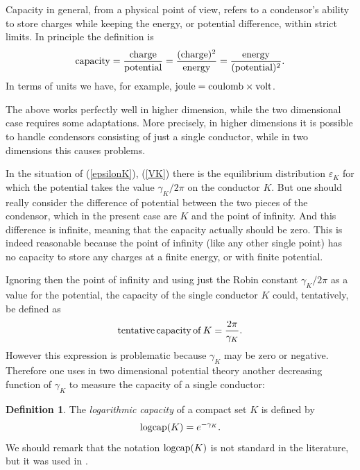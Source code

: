 \documentclass[reqno,12pt]{article}
\theoremstyle{plain}
\theoremstyle{definition}
\newtheorem{definition}{Definition}[section]
\numberwithin{equation}{section}
\numberwithin{figure}{section}
\begin{document}
Capacity in general, from a physical point of view, refers to a condensor's ability to store
charges while keeping the energy, or potential difference, within strict limits. In principle the definition is
\begin{equation}\label{capacity}
{\rm capacity}=\frac{\rm charge}{\rm potential}=\frac{({\rm charge})^2}{\rm energy}=\frac{\rm energy}{({\rm potential})^2}.
\end{equation}
In terms of units we have, for example, ${\rm joule}={\rm coulomb}\times {\rm volt}$.

The above works perfectly well in higher dimension, while the two dimensional case requires some adaptations.
More precisely, in higher dimensions it is possible to handle condensors consisting of just a single conductor,
while in two dimensions this causes problems.

In the situation of (\ref{epsilonK}), (\ref{VK}) there is the equilibrium distribution $\varepsilon_K$
for which the potential  takes the value $\gamma_K/2\pi$ on the conductor $K$. 
But one should really consider the difference of
potential between the two pieces of the condensor, which in the present case are $K$ and the point of infinity.
And this difference is infinite, meaning that the capacity actually should be zero. This is indeed reasonable
because the point of infinity (like any other single point) has no capacity to store any charges at a finite energy, 
or with finite potential.

Ignoring then the point of infinity and using just the Robin constant $\gamma_K/2\pi$ as a value for the potential, the capacity 
of the single conductor $K$ could, tentatively, be defined as
$$
{\rm tentative\,capacity\,of\,}K=\frac{2\pi}{\gamma_K}.
$$
However this expression is problematic because $\gamma_K$
may be zero or negative. Therefore one uses in two dimensional potential theory another
decreasing function of $\gamma_K$ to measure the capacity of a single conductor: 
\begin{definition}
The {\it logarithmic capacity} of a compact set $K$ is defined by
\begin{equation}\label{logcap}
{\rm logcap}(K)= e^{-\gamma_K}.
\end{equation}
We should remark that the notation ${\rm logcap}(K)$ is not standard in the literature, but it was used in \cite{Gustafsson-2004}.
\end{definition}
\end{document}
